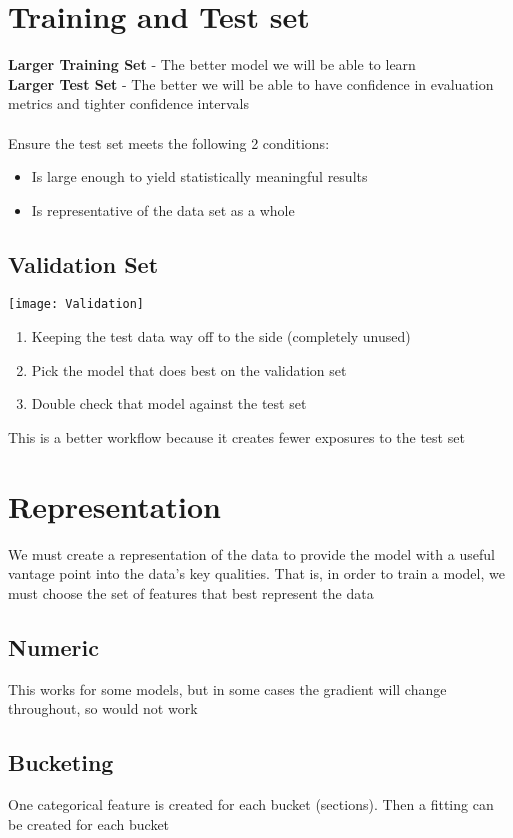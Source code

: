 \documentclass{article}[18pt]
\begin{document}
\section{Training and Test set}
\textbf{Larger Training Set} - The better model we will be able to learn\\
\textbf{Larger Test Set} - The better we will be able to have confidence in evaluation metrics and tighter confidence intervals\\
\\
Ensure the test set meets the following 2 conditions:
\begin{itemize}
	\item Is large enough to yield statistically meaningful results
	\item Is representative of the data set as a whole
\end{itemize}
\subsection{Validation Set}
\begin{center}
	\texttt{[image: Validation]}
\end{center}
\begin{enumerate}
	\item Keeping the test data way off to the side (completely unused)
	\item Pick the model that does best on the validation set
	\item Double check that model against the test set 
\end{enumerate}
This is a better workflow because it creates fewer exposures to the test set
\section{Representation}
We must create a representation of the data to provide the model with a useful vantage point into the data's key qualities. That is, in order to train a model, we must choose the set of features that best represent the data
\subsection{Numeric}
This works for some models, but in some cases the gradient will change throughout, so would not work
\subsection{Bucketing}
One categorical feature is created for each bucket (sections). Then a fitting can be created for each bucket
\end{document}

